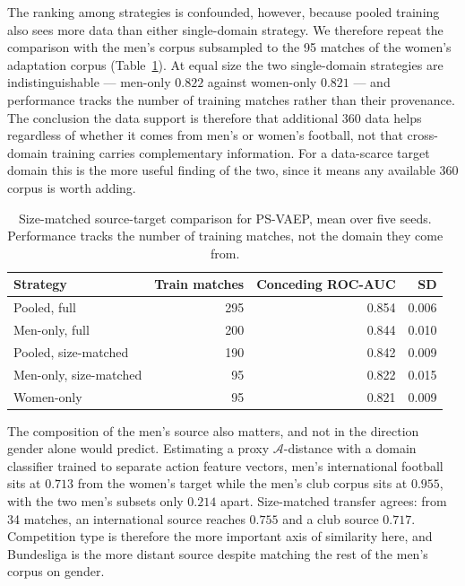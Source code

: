 \documentclass[runningheads]{llncs}
\begin{document}
The ranking among strategies is confounded, however, because pooled training also sees more data than either single-domain strategy. We therefore repeat the comparison with the men's corpus subsampled to the 95 matches of the women's adaptation corpus (Table~\ref{tab:sizematched}). At equal size the two single-domain strategies are indistinguishable --- men-only $0.822$ against women-only $0.821$ --- and performance tracks the number of training matches rather than their provenance. The conclusion the data support is therefore that additional 360 data helps regardless of whether it comes from men's or women's football, not that cross-domain training carries complementary information. For a data-scarce target domain this is the more useful finding of the two, since it means any available 360 corpus is worth adding.

\begin{table}[tbp]
\footnotesize
\centering
\caption{Size-matched source-target comparison for PS-VAEP, mean over five seeds. Performance tracks the number of training matches, not the domain they come from.}
\label{tab:sizematched}
\begin{tabular}{lrrr}
\toprule
\textbf{Strategy} & \textbf{Train matches} & \textbf{Conceding ROC-AUC} & \textbf{SD} \\
\midrule
Pooled, full & 295 & 0.854 & 0.006 \\
Men-only, full & 200 & 0.844 & 0.010 \\
Pooled, size-matched & 190 & 0.842 & 0.009 \\
Men-only, size-matched & 95 & 0.822 & 0.015 \\
Women-only & 95 & 0.821 & 0.009 \\
\bottomrule
\end{tabular}
\end{table}

The composition of the men's source also matters, and not in the direction gender alone would predict. Estimating a proxy $\mathcal{A}$-distance with a domain classifier trained to separate action feature vectors, men's international football sits at $0.713$ from the women's target while the men's club corpus sits at $0.955$, with the two men's subsets only $0.214$ apart. Size-matched transfer agrees: from 34 matches, an international source reaches $0.755$ and a club source $0.717$. Competition type is therefore the more important axis of similarity here, and Bundesliga is the more distant source despite matching the rest of the men's corpus on gender.
\end{document}
